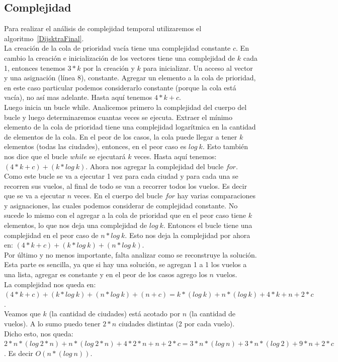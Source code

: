 \newpage
\subsection{Complejidad}
Para realizar el análisis de complejidad temporal utilizaremos el algoritmo~\ref{DijsktraFinal}. \\
La creación de la cola de prioridad vacía tiene una complejidad constante $c$. 
En cambio la creación e inicialización de los vectores tiene una complejidad de $k$ cada 1, entonces tenemos $3*k$ por la creación 
y $k$ para inicializar. Un acceso al vector y una asignación (línea 8), constante. Agregar un elemento a la cola de prioridad, en este caso particular
podemos considerarlo constante (porque la cola está vacía), no así mas adelante. Hasta aquí tenemos $4*k + c$.\\
Luego inicia un bucle while. Analicemos primero la complejidad del cuerpo del bucle y luego determinaremos cuantas veces se ejecuta. 
Extraer el mínimo elemento de la cola de prioridad tiene una complejidad logarítmica\cite{priorityQueuePop} en la cantidad de elementos de la cola. 
En el peor de los casos, la cola puede llegar a tener $k$ elementos (todas las ciudades), entonces, en el peor caso es $log\ k$. Esto también
nos dice que el bucle $while$ se ejecutará $k$ veces. Hasta aquí tenemos: $(4*k + c) + (k*log\ k)$.
Ahora nos agregar la complejidad del bucle $for$.
Como este bucle se va a ejecutar 1 vez para cada ciudad y para cada una se recorren sus vuelos, al final de todo se van a recorrer todos los vuelos.
Es decir que se va a ejecutar $n$ veces.
En el cuerpo del bucle $for$ hay varias comparaciones y asignaciones, las cuales podemos considerar
de complejidad constante. No sucede lo mismo con el agregar a la cola de prioridad que en el peor caso tiene $k$ elementos, lo que nos deja
una complejidad de $log\ k$. Entonces el bucle tiene una complejidad en el peor caso de $n*log\ k$. 
Esto nos deja la complejidad por ahora en: $(4*k + c) + (k*log\ k) + (n*log\ k)$.\\
Por último y no menos importante, falta analizar como se reconstruye la solución. Esta parte es sencilla, ya que si hay una solución, se agregan 1 a 1
los vuelos a una lista, agregar es constante y en el peor de los casos agrego los $n$ vuelos.\\
La complejidad nos queda en: $(4*k + c) + (k*log\ k) + (n*log\ k) + (n+c) = k*(log\ k) + n*(log\ k) + 4*k + n + 2*c$.\\

Veamos que $k$ (la cantidad de ciudades) está acotado por $n$ (la cantidad de vuelos). A lo sumo puedo tener $2*n$ ciudades distintas (2 por cada vuelo).\\
Dicho esto, nos queda: $2*n*(log\ 2*n) + n*(log\ 2*n) + 4*2*n + n + 2*c = 3*n*(log\ n) + 3*n*(log\ 2) + 9*n + 2*c$. Es decir $O(n*(log\ n))$.


